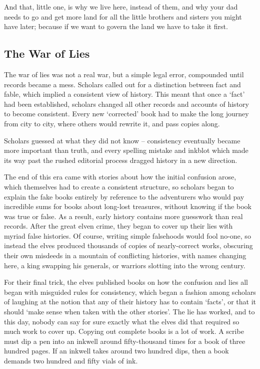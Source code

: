 \begin{multicols}{2}
\begin{exampletext}
  And that, little one, is why we live here, instead of them, and why your dad needs to go and get more land for all the little brothers and sisters you might have later; because if we want to govern the land we have to take it first.
\fi

\end{exampletext}

\subsection{The War of Lies}
\label{warOfLies}

\begin{exampletext}
  \ifcase\value{r4}\relax\or
    The war of lies was not a real war, but a simple legal error, compounded until records became a mess.
    Scholars called out for a distinction between fact and fable, which implied a consistent view of history.
    This meant that once a `fact' had been established, scholars changed all other records and accounts of history to become consistent.
    Every new `corrected' book had to make the long journey from city to city, where others would rewrite it, and pass copies along.

    Scholars guessed at what they did not know -- consistency eventually became more important than truth, and every spelling mistake and inkblot which made its way past the rushed editorial process dragged history in a new direction.

    The end of this era came with stories about how the initial confusion arose, which themselves had to create a consistent structure, so scholars began to explain the fake books entirely by reference to the adventurers who would pay incredible sums for books about long-lost treasures, without knowing if the book was true or false.
    As a result, early history contains more guesswork than real records.
  \or
    After the great elven crime, they began to cover up their lies with myriad false histories.
    Of course, writing simple falsehoods would fool no-one, so instead the elves produced thousands of copies of nearly-correct works, obscuring their own misdeeds in a mountain of conflicting histories, with names changing here, a king swapping his generals, or warriors slotting into the wrong century.

    For their final trick, the elves published books on how the confusion and lies all began with misguided rules for consistency, which began a fashion among scholars of laughing at the notion that any of their history has to contain `facts', or that it should `make sense when taken with the other stories'.
    The lie has worked, and to this day, nobody can say for sure exactly what the elves did that required so much work to cover up.
  \or
  Copying out complete books is a lot of work.
  A scribe must dip a pen into an inkwell around fifty-thousand times for a book of three hundred pages.
  If an inkwell takes around two hundred dips, then a book demands two hundred and fifty vials of ink.


\end{exampletext}
\end{multicols}
